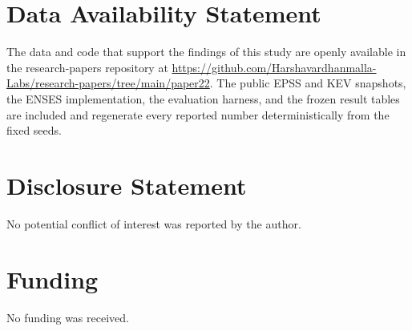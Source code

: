 \documentclass[review,3p,times]{elsarticle}
\begin{document}
\section*{Data Availability Statement}
The data and code that support the findings of this study are openly available
in the research-papers repository at
\url{https://github.com/Harshavardhanmalla-Labs/research-papers/tree/main/paper22}.
The public EPSS and KEV snapshots, the ENSES implementation, the evaluation
harness, and the frozen result tables are included and regenerate every reported
number deterministically from the fixed seeds.

\section*{Disclosure Statement}
No potential conflict of interest was reported by the author.

\section*{Funding}
No funding was received.
\end{document}
